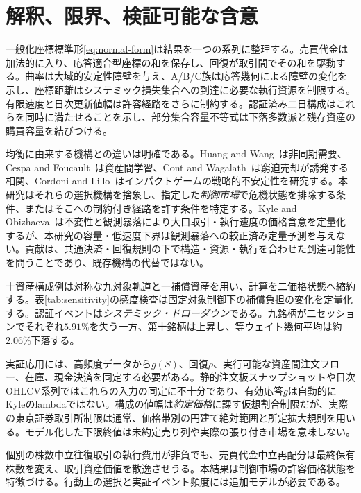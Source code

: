 \documentclass[11pt]{article}
\numberwithin{equation}{section}
\theoremstyle{definition}
\theoremstyle{remark}
\begin{document}
\section{解釈、限界、検証可能な含意}\label{sec:discussion}
一般化座標標準形\eqref{eq:normal-form}は結果を一つの系列に整理する。売買代金は加法的に入り、応答適合型座標の和を保存し、回復が取引間でその和を駆動する。曲率は大域的安定性障壁を与え、A/B/C族は応答幾何による障壁の変化を示し、座標距離はシステミック損失集合への到達に必要な執行資源を制限する。有限速度と日次更新値幅は許容経路をさらに制約する。認証済み二日構成はこれらを同時に満たせることを示し、部分集合容量不等式は下落多数派と残存資産の購買容量を結びつける。

均衡に由来する機構との違いは明確である。Huang and Wang~\citep{HuangWang2009}は非同期需要、Cespa and Foucault~\citep{CespaFoucault2014}は資産間学習、Cont and Wagalath~\citep{ContWagalath2013}は窮迫売却が誘発する相関、Cordoni and Lillo~\citep{CordoniLillo2024}はインパクトゲームの戦略的不安定性を研究する。本研究はそれらの選択機構を捨象し、指定した\emph{制御市場}で危機状態を排除する条件、またはそこへの制約付き経路を許す条件を特定する。Kyle and Obizhaeva~\citep{KyleObizhaeva2023}は不変性と観測暴落により大口取引・執行速度の価格含意を定量化するが、本研究の容量・低速度下界は観測暴落への較正済み定量予測を与えない。貢献は、共通決済・回復規則の下で構造・資源・執行を合わせた到達可能性を問うことであり、既存機構の代替ではない。

十資産構成例は対称な九対象軌道と一補償資産を用い、計算を二価格状態へ縮約する。表\ref{tab:sensitivity}の感度検査は固定対象制御下の補償負担の変化を定量化する。認証イベントは\emph{システミック・ドローダウン}である。九銘柄が二セッションでそれぞれ$5.91\%$を失う一方、第十銘柄は上昇し、等ウェイト幾何平均は約$2.06\%$下落する。

実証応用には、高頻度データから$g(S)$、回復$\rho$、実行可能な資産間注文フロー、在庫、現金決済を同定する必要がある。静的注文板スナップショットや日次OHLCV系列ではこれらの入力の同定に不十分であり、有効応答$g$は自動的にKyleのlambdaではない。構成の値幅は\emph{約定価格}に課す仮想割合制限だが、実際の東京証券取引所制限は通常、価格帯別の円建て絶対範囲と所定拡大規則を用いる\citep{JPX2026}。モデル化した下限終値は未約定売り列や実際の張り付き市場を意味しない。

個別の株数中立往復取引の執行費用が非負でも、売買代金中立再配分は最終保有株数を変え、取引資産価値を散逸させうる。本結果は制御市場の許容価格状態を特徴づける。行動上の選択と実証イベント頻度には追加モデルが必要である。
\end{document}
